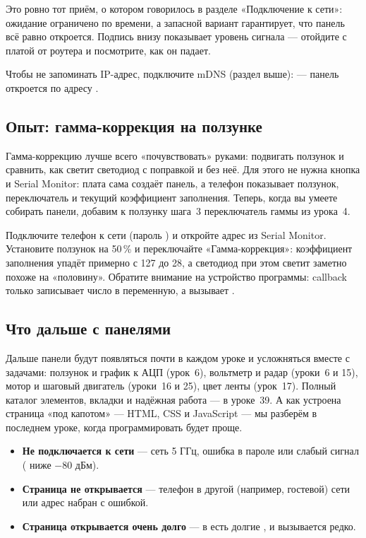 Это ровно тот приём, о котором говорилось в разделе «Подключение к сети»: ожидание ограничено по времени, а
запасной вариант гарантирует, что панель всё равно откроется. Подпись внизу показывает уровень сигнала
 --- отойдите с платой от роутера и посмотрите, как он падает.

\begin{tip}
Чтобы не запоминать IP-адрес, подключите mDNS (раздел выше):  --- панель откроется по
адресу .
\end{tip}

\subsection{Опыт: гамма-коррекция на ползунке}

Гамма-коррекцию лучше всего «почувствовать» руками: подвигать ползунок и сравнить, как светит
светодиод с поправкой и без неё. Для этого не нужна кнопка и Serial Monitor: плата сама создаёт
панель, а телефон показывает ползунок, переключатель и текущий коэффициент заполнения. Теперь, когда вы умеете собирать панели, добавим к ползунку шага~3 переключатель гаммы из урока~4.


Подключите телефон к сети  (пароль ) и откройте адрес из
Serial Monitor. Установите ползунок на 50\,\% и переключайте «Гамма-коррекция»: коэффициент
заполнения упадёт примерно с 127 до 28, а светодиод при этом светит заметно похоже на «половину».
Обратите внимание на устройство программы: callback только записывает число в переменную,
а  вызывает .

\subsection{Что дальше с панелями}

Дальше панели будут появляться почти в каждом уроке и усложняться вместе с задачами: ползунок и график к
АЦП (урок~6), вольтметр и радар (уроки~6 и 15), мотор и шаговый двигатель (уроки~16 и 25), цвет ленты
(урок~17). Полный каталог элементов, вкладки и надёжная работа --- в уроке~39. А как устроена страница
«под капотом» --- HTML, CSS и JavaScript --- мы разберём в последнем уроке, когда программировать будет проще.

\begin{trouble}
\begin{itemize}[leftmargin=*]
  \item \textbf{Не подключается к сети} --- сеть 5 ГГц, ошибка в пароле или слабый сигнал ( ниже $-80$ дБм).
  \item \textbf{Страница не открывается} --- телефон в другой (например, гостевой) сети или адрес набран с ошибкой.
  \item \textbf{Страница открывается очень долго} --- в  есть долгие , и  вызывается редко.
\end{itemize}
\end{trouble}



